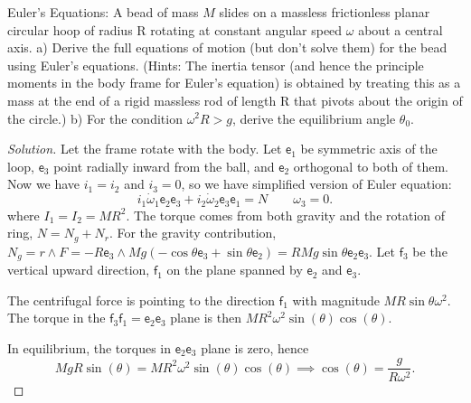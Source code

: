 \begin{problem}
	Euler's Equations: A bead of mass $M$ slides on a massless frictionless planar circular hoop of radius $\mathrm{R}$ rotating at constant angular speed $\omega$ about a central axis.
a) Derive the full equations of motion (but don't solve them) for the bead using Euler's equations. (Hints: The inertia tensor (and hence the principle moments in the body frame for Euler's equation) is obtained by treating this as a mass at the end of a rigid massless rod of length $\mathrm{R}$ that pivots about the origin of the circle.)
b) For the condition $\omega^2 R>g$, derive the equilibrium angle $\theta_0$.
\end{problem}
\begin{proof}[Solution]
	Let the frame rotate with the body. Let  $\mathsf{e}_1$ be symmetric axis of the loop, $\mathsf{e}_3$ point radially inward from the ball, and $\mathsf{e}_2$ orthogonal to both of them. Now we have $i_1 = i_2$ and $i_3 = 0$, so we have simplified version of Euler equation:
	\[
		i_1 \dot{\omega}_1 \mathsf{e}_2 \mathsf{e}_3 + i_2 \dot{\omega}_2 \mathsf{e}_3 \mathsf{e}_1 = N \qquad \omega_3 = 0
	.\] 
	where $I_1 = I_2 = M R^2$. The torque comes from both gravity and the rotation of ring, $N = N_g + N_r$. For the gravity contribution, $N_g = r \wedge F = -R \mathsf{e}_3 \wedge  M g\left( - \cos \theta \mathsf{e}_3 + \sin \theta \mathsf{e}_2 \right) = R M g \sin \theta \mathsf{e}_2 \mathsf{e}_3$. 
	Let $\mathsf{f}_3$ be the vertical upward direction, $\mathsf{f}_1$ on the plane spanned by $\mathsf{e}_2$ and $\mathsf{e}_3$. 

	The centrifugal force is pointing to the direction $\mathsf{f}_1$ with magnitude $M R \sin \theta \omega^2$. The torque in the $\mathsf{f}_3 \mathsf{f}_1 = \mathsf{e}_2 \mathsf{e}_3$ plane is then $M R^2 \omega^2 \sin(\theta) \cos(\theta)$.


	In equilibrium, the torques in $\mathsf{e}_2 \mathsf{e}_3$ plane is zero, hence
	\[
		M g R \sin(\theta) = M R^2 \omega^2 \sin(\theta) \cos(\theta) \implies
		\cos(\theta) = \frac{g}{R \omega^2}
	.\] 

\end{proof}

